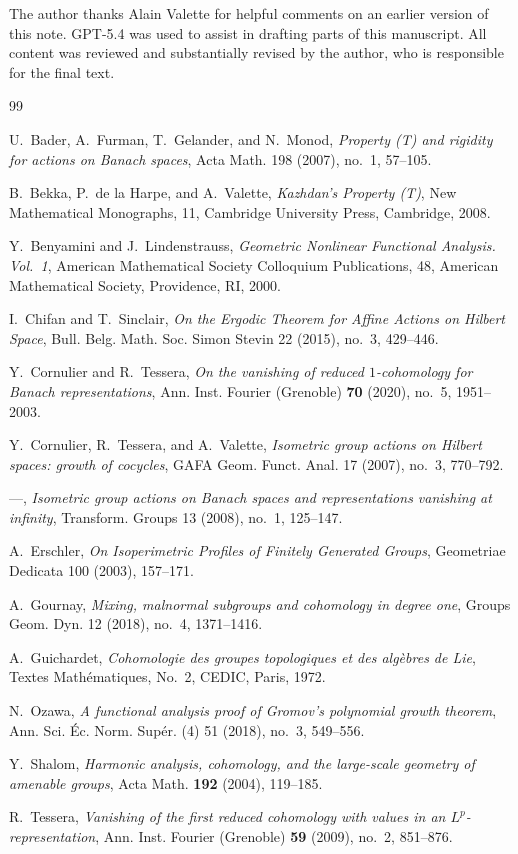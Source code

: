 \documentclass[a4paper,11pt]{amsproc}
\theoremstyle{remark}
\begin{document}
The author thanks Alain Valette for helpful comments on an earlier version of this note.
GPT-5.4 was used to assist in drafting parts of this manuscript. All content was reviewed and substantially revised by the author, who is responsible for the final text.
\begin{thebibliography}{99}

U.~Bader, A.~Furman, T.~Gelander, and N.~Monod,
\emph{Property (T) and rigidity for actions on Banach spaces},
Acta Math. 198 (2007), no.~1, 57--105.

B.~Bekka, P.~de la Harpe, and A.~Valette,
\emph{Kazhdan's Property (T)},
New Mathematical Monographs, 11, Cambridge University Press, Cambridge, 2008.

Y.~Benyamini and J.~Lindenstrauss,
\emph{Geometric Nonlinear Functional Analysis. Vol.~1},
American Mathematical Society Colloquium Publications, 48,
American Mathematical Society, Providence, RI, 2000.

I.~Chifan and T.~Sinclair,
\emph{On the Ergodic Theorem for Affine Actions on Hilbert Space},
Bull. Belg. Math. Soc. Simon Stevin 22 (2015), no.~3, 429--446.

Y.~Cornulier and R.~Tessera,
\emph{On the vanishing of reduced $1$-cohomology for Banach representations},
Ann. Inst. Fourier (Grenoble) \textbf{70} (2020), no.~5, 1951--2003.

Y.~Cornulier, R.~Tessera, and A.~Valette,
\emph{Isometric group actions on {H}ilbert spaces: growth of cocycles},
GAFA Geom. Funct. Anal. 17 (2007), no.~3, 770--792.

---,
\emph{Isometric group actions on Banach spaces and representations vanishing at infinity},
Transform. Groups 13 (2008), no.~1, 125--147.

A.~Erschler,
\emph{On Isoperimetric Profiles of Finitely Generated Groups}, 
Geometriae Dedicata 100 (2003), 157–171.

A.~Gournay,
\emph{Mixing, malnormal subgroups and cohomology in degree one},
Groups Geom. Dyn. 12 (2018), no.~4, 1371--1416.

A.~Guichardet,
\emph{Cohomologie des groupes topologiques et des alg\`ebres de Lie},
Textes Math\'ematiques, No.~2, CEDIC, Paris, 1972.

N.~Ozawa,
\emph{A functional analysis proof of Gromov's polynomial growth theorem},
Ann. Sci. \'Ec. Norm. Sup\'er. (4) 51 (2018), no.~3, 549--556.

Y.~Shalom,
\emph{Harmonic analysis, cohomology, and the large-scale geometry of amenable groups},
Acta Math. \textbf{192} (2004), 119--185.

R.~Tessera,
\emph{Vanishing of the first reduced cohomology with values in an $L^p$-representation},
Ann. Inst. Fourier (Grenoble) \textbf{59} (2009), no.~2, 851--876.

\end{thebibliography}
\end{document}
